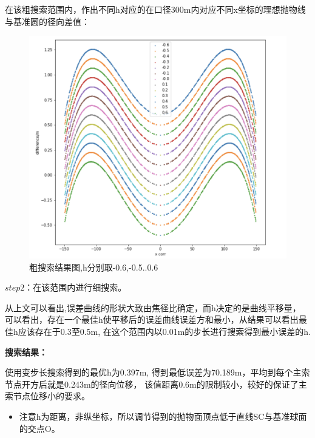 \documentclass[withoutpreface,bwprint]{cumcmthesis} %
\begin{document}
在该粗搜索范围内，作出不同h对应的在口径300m内对应不同x坐标的理想抛物线与基准圆的径向差值：


\begin{figure}[H]
    \centering
    \includegraphics[scale=0.3]{images/cu.png}
    \caption{粗搜索结果图,h分别取-0.6,-0.5..0.6}
\end{figure}



\textbf{$step2$}：在该范围内进行细搜索。

    从上文可以看出,误差曲线的形状大致由焦径比确定，而h决定的是曲线平移量，
可以看出，存在一个最佳h使平移后的误差曲线误差方和最小，从结果可以看出最佳h应该存在于0.3至0.5m,
在这个范围内以0.01m的步长进行搜索得到最小误差的h.

\hspace*{\fill}

\textbf{搜索结果：}

使用变步长搜索得到的最优h为0.397m, 得到最低误差为70.189m，平均到每个主索节点开方后就是0.243m的径向位移，
该值距离0.6m的限制较小，较好的保证了主索节点位移小的要求。

\begin{itemize}
    \item 注意h为距离，非纵坐标，所以调节得到的抛物面顶点低于直线SC与基准球面的交点O。
\end{itemize}

\hspace*{\fill}
\hspace*{\fill}
\end{document}
